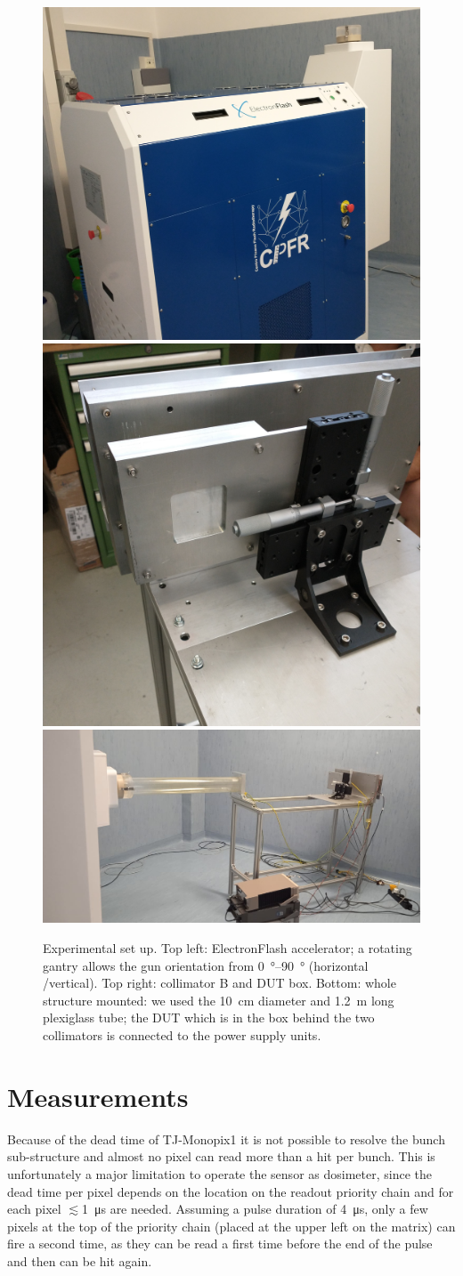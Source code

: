       \begin{figure}[h!]
         \centering
         \includegraphics[width=.40\linewidth]{figures/test_beam/electron_flash.jpg}
         \includegraphics[width=.35\linewidth]{figures/test_beam/collimator_box.jpg}\\     
         \includegraphics[width=.77\linewidth]{figures/test_beam/carrello.jpeg} 
         \label{fig:set_up}
         \caption{Experimental set up. Top left: ElectronFlash accelerator; a
         rotating gantry allows the gun orientation from \SIrange{0}{90}{\degree} (horizontal /vertical). Top right: collimator B and DUT box. Bottom: whole structure mounted: we used the \SI{10}{cm} diameter and \SI{1.2}{m} long plexiglass tube; the DUT which is in the box behind the two collimators is connected to the power supply units.}
      \end{figure}  



\section{Measurements}\label{sec:Santa_chiara_measurement}
   Because of the dead time of TJ-Monopix1 it is not possible to resolve the bunch sub-structure and almost no pixel can read more than a hit per bunch. This is unfortunately a major limitation to operate the sensor as dosimeter, since the dead time per pixel depends on the location on the readout priority chain and for each pixel $\lesssim$\SI{1}{\us} are needed. Assuming a pulse duration of \SI{4}{\us}, only a few pixels at the top of the priority chain (placed at the upper left on the matrix) can fire a second time, as they can be read a first time before the end of the pulse and then can be hit again.


